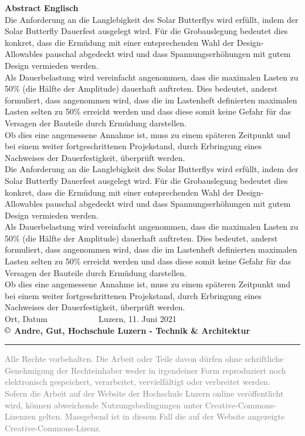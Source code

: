\textbf{Abstract Englisch}\\
Die Anforderung an die Langlebigkeit des Solar Butterflys wird erfüllt, indem der Solar Butterfly Dauerfest ausgelegt wird. Für die Grobauslegung bedeutet dies konkret, dass die Ermüdung mit einer entsprechenden Wahl der Design-Allowables pauschal abgedeckt wird und dass Spannungserhöhungen mit gutem Design vermieden werden.\\
Als Dauerbelastung wird vereinfacht angenommen, dass die maximalen Lasten zu 50\% (die Hälfte der Amplitude) dauerhaft auftreten. Dies bedeutet, anderst formuliert, dass angenommen wird, dass die im Lastenheft definierten maximalen Lasten selten zu 50\% erreicht werden und dass diese somit keine Gefahr für das Versagen der Bauteile durch Ermüdung darstellen.\\
Ob dies eine angemessene Annahme ist, muss zu einem späteren Zeitpunkt und bei einem weiter fortgeschrittenen Projekstand, durch Erbringung eines Nachweises der Dauerfestigkeit, überprüft werden.\\
Die Anforderung an die Langlebigkeit des Solar Butterflys wird erfüllt, indem der Solar Butterfly Dauerfest ausgelegt wird. Für die Grobauslegung bedeutet dies konkret, dass die Ermüdung mit einer entsprechenden Wahl der Design-Allowables pauschal abgedeckt wird und dass Spannungserhöhungen mit gutem Design vermieden werden.\\
Als Dauerbelastung wird vereinfacht angenommen, dass die maximalen Lasten zu 50\% (die Hälfte der Amplitude) dauerhaft auftreten. Dies bedeutet, anderst formuliert, dass angenommen wird, dass die im Lastenheft definierten maximalen Lasten selten zu 50\% erreicht werden und dass diese somit keine Gefahr für das Versagen der Bauteile durch Ermüdung darstellen.\\
Ob dies eine angemessene Annahme ist, muss zu einem späteren Zeitpunkt und bei einem weiter fortgeschrittenen Projekstand, durch Erbringung eines Nachweises der Dauerfestigkeit, überprüft werden.\\

\vspace{2cm}
Ort, Datum $\;\;\;\;\;\;\;\;\;\;\;\;\;\;\;\;\;\;\;\;$ Luzern, 11. Juni 2021\\
\textbf{{\small $\copyright$} Andre, Gut, Hochschule Luzern - Technik \& Architektur}

\vspace*{\fill}

\noindent
{\color{gray} \rule{\linewidth}{0.5px} }
\begin{footnotesize}
  \textcolor{gray}{Alle Rechte vorbehalten. Die Arbeit oder Teile davon dürfen ohne schriftliche Genehmigung der Rechteinhaber weder in irgendeiner Form reproduziert noch elektronisch gespeichert, verarbeitet, vervielfältigt oder verbreitet werden.}\\
  \textcolor{gray}{Sofern die Arbeit auf der Website der Hochschule Luzern online veröffentlicht wird, können abweichende Nutzungsbedingungen unter Creative-Commons-Lizenzen gelten. Massgebend ist in diesem Fall die auf der Website angezeigte Creative-Commons-Lizenz.}
\end{footnotesize}
\newpage
